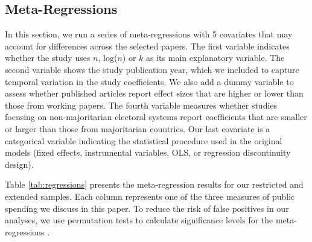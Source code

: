 \documentclass[a4paper,12pt]{article}
\begin{document}
\subsection{Meta-Regressions}
\label{sub:regressions}

In this section, we run a series of meta-regressions with 5 covariates that may
account for differences across the selected papers. The first variable indicates
whether the study uses $n$, log($n$) or $k$ as its main explanatory variable.
The second variable shows the study publication year, which we included to
capture temporal variation in the study coefficients. We also add a dummy
variable to assess whether published articles report effect sizes that are
higher or lower than those from working papers. The fourth variable measures
whether studies focusing on non-majoritarian electoral systems report
coefficients that are smaller or larger than those from majoritarian countries.
Our last covariate is a categorical variable indicating the statistical
procedure used in the original models (fixed effects, instrumental variables,
OLS, or regression discontinuity design).

Table \ref{tab:regressions} presents the meta-regression results for our
restricted and extended samples. Each column represents one of the three
measures of public spending we discuss in this paper. To reduce the risk of
false positives in our analyses, we use permutation tests to calculate
significance levels for the meta-regressions \citep{higgins2004controlling}.

\vspace{.5cm}
\end{document}
